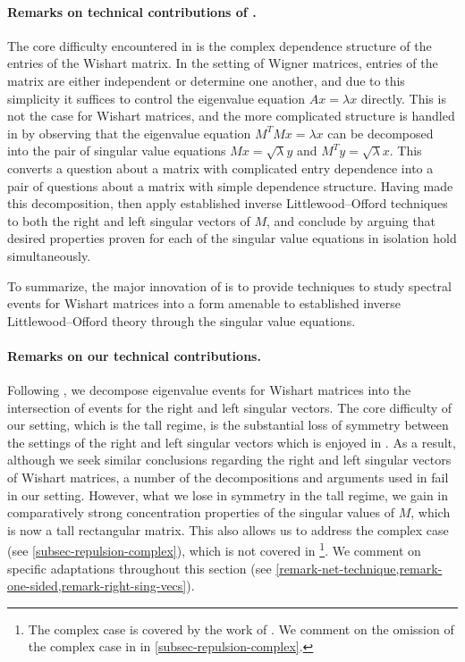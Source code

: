 \documentclass[11pt]{article}
\numberwithin{equation}{section}
\theoremstyle{remark}
\begin{document}
\paragraph{Remarks on technical contributions of \cite{christoffersen2025gaps}.}
The core difficulty encountered in \cite{christoffersen2025gaps} is the complex dependence structure of the entries of the Wishart matrix. In the setting of Wigner matrices, entries of the matrix are either independent or determine one another, and due to this simplicity it suffices to control the eigenvalue equation $Ax = \lambda x$ directly. This is not the case for Wishart matrices, and the more complicated structure is handled in \cite{christoffersen2025gaps} by observing that the eigenvalue equation $M^T M x = \lambda x$ can be decomposed into the pair of singular value equations $Mx = \sqrt{\lambda}y$ and $M^T y = \sqrt{\lambda} x$. This converts a question about a matrix with complicated entry dependence into a pair of questions about a matrix with simple dependence structure. Having made this decomposition, \cite{christoffersen2025gaps} then apply established inverse Littlewood--Offord techniques to both the right and left singular vectors of $M$, and conclude by arguing that desired properties proven for each of the singular value equations in isolation hold simultaneously. 

To summarize, the major innovation of \cite{christoffersen2025gaps} is to provide techniques to study spectral events for Wishart matrices into a form amenable to established inverse Littlewood--Offord theory through the singular value equations.

\paragraph{Remarks on our technical contributions.} 
Following \cite{christoffersen2025gaps}, we decompose eigenvalue events for Wishart matrices into the intersection of events for the right and left singular vectors. The core difficulty of our setting, which is the tall regime, is the substantial loss of symmetry between the settings of the right and left singular vectors which is enjoyed in \cite{christoffersen2025gaps}. As a result, although we seek similar conclusions regarding the right and left singular vectors of Wishart matrices, a number of the decompositions and arguments used in \cite{christoffersen2025gaps} fail in our setting. However, what we lose in symmetry in the tall regime, we gain in comparatively strong concentration properties of the singular values of $M$, which is now a tall rectangular matrix. This also allows us to address the complex case (see \cref{subsec-repulsion-complex}), which is not covered in \cite{christoffersen2025gaps} \footnote{The complex case is covered by the work of \cite{han2025simplicity}. We comment on the omission of the complex case in \cite{christoffersen2025gaps} in \cref{subsec-repulsion-complex}.}. We comment on specific adaptations throughout this section (see \cref{remark-net-technique,remark-one-sided,remark-right-sing-vecs}).
\end{document}
